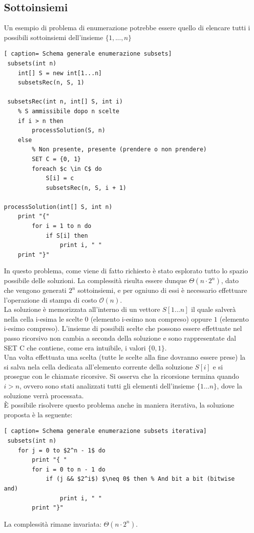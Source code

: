 \documentclass[../cheatSheetAlgoritmi.tex]{subfiles}
\begin{document}
\subsection{Sottoinsiemi}
Un esempio di problema di enumerazione potrebbe essere quello di elencare tutti i possibili sottoinsiemi dell'insieme $\{ 1, ..., n\}$
 \begin{lstlisting}[ caption= Schema generale enumerazione subsets]
 subsets(int n)
	int[] S = new int[1...n]
 	subsetsRec(n, S, 1) 
 	
 subsetsRec(int n, int[] S, int i)
 	% S ammissibile dopo n scelte
 	if i > n then
 		processSolution(S, n)
 	else 
 		% Non presente, presente (prendere o non prendere)
 		SET C = {0, 1}
 		foreach $c \in C$ do
 			S[i] = c
 			subsetsRec(n, S, i + 1)
 
processSolution(int[] S, int n)
	print "{"
		for i = 1 to n do
			if S[i] then
				print i, " "
	print "}"
\end{lstlisting}
In questo problema, come viene di fatto richiesto è stato esplorato tutto lo spazio possibile delle soluzioni. La complessità risulta essere dunque $\Theta(n \cdot 2^n)$, dato che vengono generati $2^n$ sottoinsiemi, e per ogniuno di essi è necessario effettuare l'operazione di stampa di costo $\mathcal{O}(n)$. \\
La soluzione è memorizzata all'interno di un vettore $S[1 ... n]$ il quale salverà nella cella i-esima le scelte $0$ (elemento i-esimo non compreso) oppure $1$ (elemento i-esimo compreso). L'insieme di possibili scelte che possono essere effettuate nel passo ricorsivo non cambia a seconda della soluzione e sono rappresentate dal SET C che contiene, come era intuibile, i valori $\{0, 1\}$. \\
Una volta effettuata una scelta (tutte le scelte alla fine dovranno essere prese) la si salva nela cella dedicata all'elemento corrente della soluzione $S[i]$ e si prosegue con le chiamate ricorsive.
Si osserva che la ricorsione termina quando $i > n$, ovvero sono stati analizzati tutti gli elementi dell'insieme $\{1...n\}$, dove la soluzione verrà processata. \\
È possibile risolvere questo problema anche in maniera iterativa, la soluzione proposta è la seguente:
 \begin{lstlisting}[ caption= Schema generale enumerazione subsets iterativa]
 subsets(int n)
	for j = 0 to $2^n - 1$ do
		print "{ "
		for i = 0 to n - 1 do
			if (j && $2^i$) $\neq 0$ then % And bit a bit (bitwise and)
				print i, " "
		print "}"
\end{lstlisting}
La complessità rimane invariata: $\Theta(n \cdot 2^n)$. 
\end{document}
